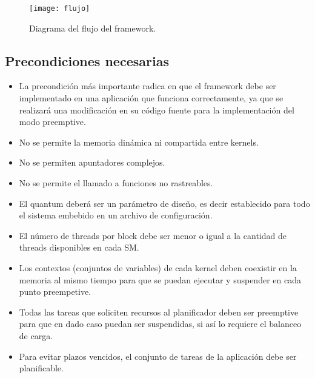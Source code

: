   \begin{figure}[!]
      \centering
        \texttt{[image: flujo]}
        \caption{Diagrama del flujo del framework.}
        \label{fig:flujo}
    \end{figure}

\subsection{Precondiciones necesarias} \label{secc:precondiciones}

\begin{itemize}
\item La precondición más importante radica en que el framework debe ser implementado en una aplicación que funciona correctamente, ya que se realizará una modificación en su código fuente para la implementación del modo preemptive.

\item No se permite la memoria dinámica ni compartida entre kernels.

\item No se permiten apuntadores complejos. 

\item No se permite el llamado a funciones no rastreables.

\item El quantum deberá ser un parámetro de diseño, es decir establecido para todo el sistema embebido en un archivo de configuración.

\item El número de threads por block debe ser menor o igual a la cantidad de threads disponibles en cada SM.

 \item Los contextos (conjuntos de variables) de cada kernel deben coexistir en la memoria al mismo tiempo para que se puedan ejecutar y suspender en cada punto preempetive.

\item Todas las tareas que soliciten recursos al planificador deben ser preemptive para que en dado caso puedan ser suspendidas, si así lo requiere el balanceo de carga.

\item Para evitar plazos vencidos, el conjunto de tareas de la aplicación debe ser planificable.

\end{itemize}

